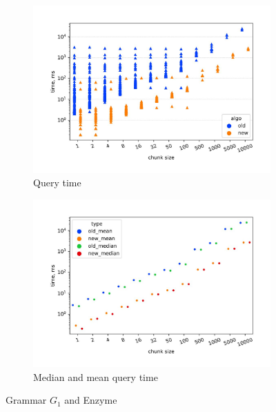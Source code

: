 \begin{figure}[h!]
    \begin{subfigure}[b]{0.5\textwidth}
    \centering
    \includegraphics[width=\textwidth]{figures/st_old_new.pdf_1.jpg}  \caption{Query time}
    \label{fig:subim1}
    \end{subfigure}%
    \begin{subfigure}[b]{0.5\textwidth}
    \centering
    \includegraphics[width=\columnwidth]{figures/st_old_new_mean&median.pdf_1.jpg} \caption{Median and mean query time}
    \label{fig:subim2}
    \end{subfigure} \caption{Grammar $G_1$ and Enzyme}
    \label{old_new}

\end{figure}
